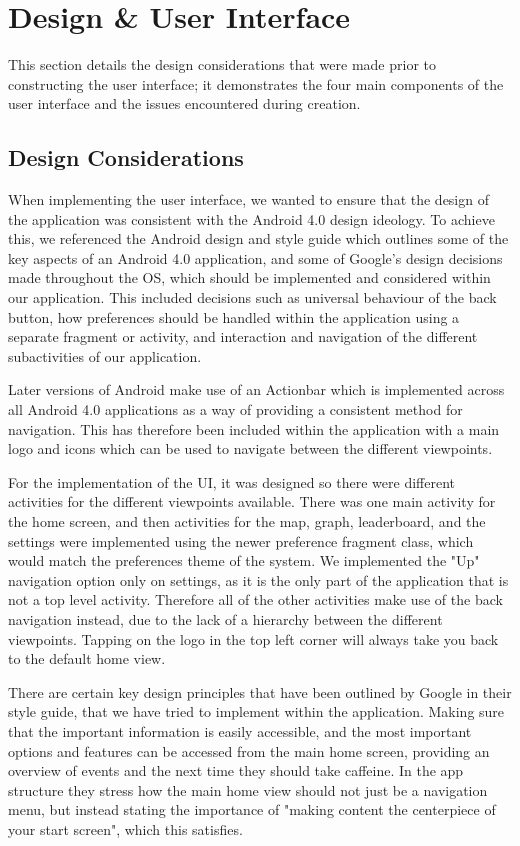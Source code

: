 \section{Design \& User Interface}

This section details the design considerations that were made prior to constructing the user interface; it demonstrates the four main components of the user interface and the issues encountered during creation.

\subsection{Design Considerations}
When implementing the user interface, we wanted to ensure that the design of the application was consistent with the Android 4.0 design ideology. To achieve this, we referenced the Android design and style guide which outlines some of the key aspects of an Android 4.0 application, and some of Google's design decisions made throughout the OS, which should be implemented and considered within our application. This included decisions such as universal behaviour of the back button, how preferences should be handled within the application using a separate fragment or activity, and interaction and navigation of the different subactivities of our application. 

Later versions of Android make use of an Actionbar which is implemented across all Android 4.0 applications as a way of providing a consistent method for navigation. This has therefore been included within the application with a main logo and icons which can be used to navigate between the different viewpoints.

For the implementation of the UI, it was designed so there were different activities for the different viewpoints available. There was one main activity for the home screen, and then activities for the map, graph, leaderboard, and the settings were implemented using the newer preference fragment class, which would match the preferences theme of the system. We implemented the "Up" navigation option only on settings, as it is the only part of the application that is not a top level activity. Therefore all of the other activities make use of the back navigation instead, due to the lack of a hierarchy between the different viewpoints. Tapping on the logo in the top left corner will always take you back to the default home view.

There are certain key design principles that have been outlined by Google in their style guide, that we have tried to implement within the application. Making sure that the important information is easily accessible, and the most important options and features can be accessed from the main home screen, providing an overview of events and the next time they should take caffeine. In the app structure they stress how the main home view should not just be a navigation menu, but instead stating the importance of "making content the centerpiece of your start screen", which this satisfies.

